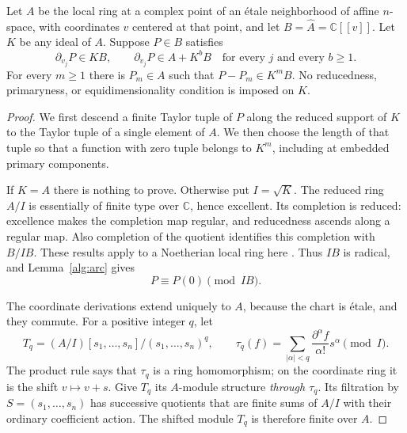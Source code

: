 \begin{lemma}
\label{alg:replacement}
Let $A$ be the local ring at a complex point of an \'etale
neighborhood of affine $n$-space, with coordinates $v$ centered at that
point, and let $B=\widehat A=\mathbb C[[v]]$. Let $K$ be any ideal of
$A$. Suppose $P\in B$ satisfies
\begin{equation}
 \partial_{v_j}P\in KB,\qquad
 \partial_{v_j}P\in A+K^bB
 \quad\text{for every $j$ and every $b\geq1$}.
 \label{alg:replacement-hyp}
\end{equation}
For every $m\geq1$ there is $P_m\in A$ such that
$P-P_m\in K^mB$. No reducedness, primaryness, or equidimensionality
condition is imposed on $K$.
\end{lemma}

\begin{proof}
We first descend a finite Taylor tuple of $P$ along the reduced support
of $K$ to the Taylor tuple of a single element of $A$. We then choose
the length of that tuple so that a function with zero tuple belongs to
$K^m$, including at embedded primary components.

If $K=A$ there is nothing to prove. Otherwise put $I=\sqrt K$.
The reduced ring $A/I$ is essentially of finite type over $\mathbb C$,
hence excellent. Its completion is reduced: excellence makes the
completion map regular, and reducedness ascends along a regular map.
Also completion of the quotient identifies this completion with $B/IB$.
These results apply to a Noetherian local ring here
\cite[Tags 07QW, 07QU, 07GH, 07QK, and 00MA]{Stacks}.
Thus $IB$ is radical, and Lemma~\ref{alg:arc} gives
\begin{equation}
 P\equiv P(0)\pmod{IB}.
 \label{alg:constant-support}
\end{equation}

The coordinate derivations extend uniquely to $A$, because the chart is
\'etale, and they commute. For a positive integer $q$, let
\[
 T_q=(A/I)[s_1,\ldots,s_n]/(s_1,\ldots,s_n)^q,\qquad
 \tau_q(f)=\sum_{|\alpha|<q}
       \frac{\partial^\alpha f}{\alpha!}s^\alpha\pmod I.
\]
The product rule says that $\tau_q$ is a ring homomorphism; on the
coordinate ring it is the shift $v\mapsto v+s$.
Give $T_q$ its $A$-module structure \emph{through $\tau_q$}. Its
filtration by $S=(s_1,\ldots,s_n)$ has successive quotients that are
finite sums of $A/I$ with their ordinary coefficient action. The shifted
module $T_q$ is therefore finite over $A$.


\end{proof}
